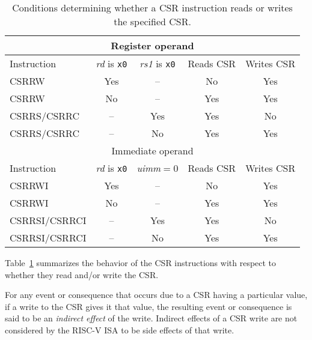 \begin{table}
  \centering
  \begin{tabular}{|l|c|c|c|c|}
    \hline
    \multicolumn{5}{|c|}{Register operand} \\
    \hline
    Instruction & \textit{rd} is \texttt{x0}
                      & \textit{rs1} is \texttt{x0}
                            & Reads CSR & Writes CSR \\
    \hline
    CSRRW       & Yes & --  & No  & Yes \\
    CSRRW       & No  & --  & Yes & Yes \\
    CSRRS/CSRRC & --  & Yes & Yes & No \\
    CSRRS/CSRRC & --  & No  & Yes & Yes \\
    \hline
    \multicolumn{5}{|c|}{Immediate operand} \\
    \hline
    Instruction & \textit{rd} is \texttt{x0}
                        & \textit{uimm}$=$0
                              & Reads CSR & Writes CSR \\
    \hline
    CSRRWI        & Yes & --  & No  & Yes \\
    CSRRWI        & No  & --  & Yes & Yes \\
    CSRRSI/CSRRCI & --  & Yes & Yes & No \\
    CSRRSI/CSRRCI & --  & No  & Yes & Yes \\
    \hline
  \end{tabular}
  \caption{Conditions determining whether a CSR instruction reads or writes
    the specified CSR.}
  \label{tab:csrsideeffects}
\end{table}

Table~\ref{tab:csrsideeffects} summarizes the behavior of the CSR
instructions with respect to whether they read and/or write the CSR.

For any event or consequence that occurs due to a CSR having a particular
value, if a write to the CSR gives it that value, the resulting event or
consequence is said to be an \emph{indirect effect} of the write.
Indirect effects of a CSR write are not considered by the RISC-V ISA to
be side effects of that write.

